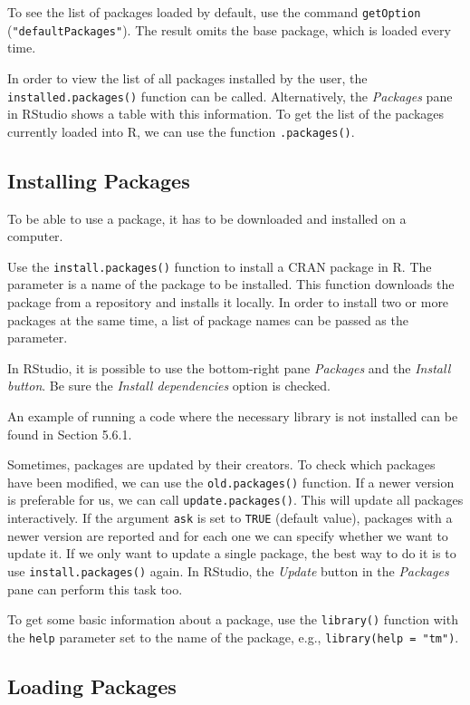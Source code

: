 To see the list of packages loaded by default, use the command \texttt{getOption}
(\texttt{"defaultPackages"}). The result omits the base package, which is loaded
every time.

In order to view the list of all packages installed by the user, the
\texttt{installed.packages()} function can be called. Alternatively, the \textit{Packages}
pane in RStudio shows a table with this information.
To get the list of the packages currently loaded into R, we can use the function
\texttt{.packages()}.

\subsection{Installing Packages}

To be able to use a package, it has to be downloaded and installed on a computer.

Use the \texttt{install.packages()} function to install a CRAN package in R.
The parameter is a name of the package to be installed. This function downloads
the package from a repository and installs it locally. In order to install two or
more packages at the same time, a list of package names can be passed as the
parameter.

In RStudio, it is possible to use the bottom-right pane \textit{Packages} and the \textit{Install
button}. Be sure the \textit{Install dependencies} option is checked.

An example of running a code where the necessary library is not installed can
be found in Section 5.6.1.

Sometimes, packages are updated by their creators. To check which packages
have been modified, we can use the \texttt{old.packages()} function. If a newer 
version is preferable for us, we can call \texttt{update.packages()}. This will 
update all packages interactively. If the argument \texttt{ask} is set to 
\texttt{TRUE} (default value), packages with a newer version are reported and 
for each one we can specify whether we want to update it. If we only want to 
update a single package, the best way to do it is to use 
\texttt{install.packages()} again. In RStudio, the \textit{Update} button in 
the \textit{Packages} pane can perform this task too.

To get some basic information about a package, use the \texttt{library()} 
function with the \texttt{help} parameter set to the name of the package, 
e.g., \texttt{library(help = "tm")}.

\subsection{Loading Packages}

